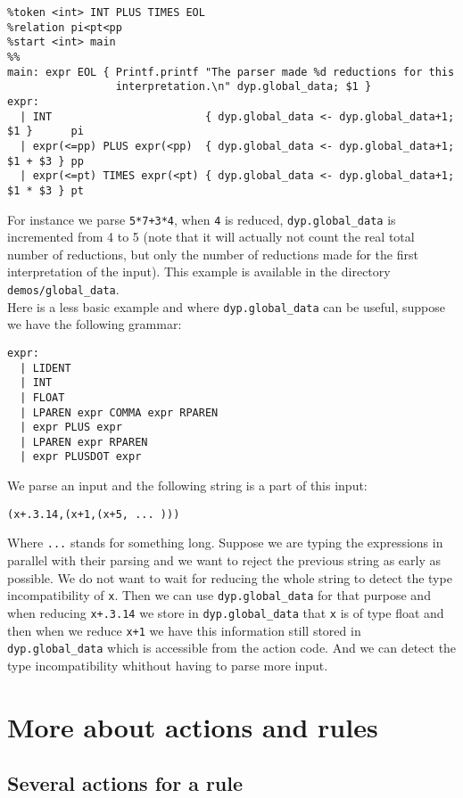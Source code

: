 \documentclass[12pt]{article}
\begin{document}
{\begin{verbatim}
%token <int> INT PLUS TIMES EOL
%relation pi<pt<pp
%start <int> main
%%
main: expr EOL { Printf.printf "The parser made %d reductions for this
                 interpretation.\n" dyp.global_data; $1 }
expr:
  | INT                        { dyp.global_data <- dyp.global_data+1; $1 }      pi
  | expr(<=pp) PLUS expr(<pp)  { dyp.global_data <- dyp.global_data+1; $1 + $3 } pp
  | expr(<=pt) TIMES expr(<pt) { dyp.global_data <- dyp.global_data+1; $1 * $3 } pt
\end{verbatim}
For instance we parse \texttt{5*7+3*4}, when \texttt{4} is reduced, \verb|dyp.global_data| is incremented from 4 to 5 (note that it will actually not count the real total number of reductions, but only the number of reductions made for the first interpretation of the input). This example is available in the directory \verb|demos/global_data|.\\

Here is a less basic example and where \verb|dyp.global_data| can be useful, suppose we have the following grammar:
\begin{verbatim}
expr:
  | LIDENT
  | INT
  | FLOAT
  | LPAREN expr COMMA expr RPAREN
  | expr PLUS expr
  | LPAREN expr RPAREN
  | expr PLUSDOT expr
\end{verbatim}

We parse an input and the following string is a part of this input:
\begin{verbatim}
(x+.3.14,(x+1,(x+5, ... )))
\end{verbatim}
Where \texttt{...} stands for something long. Suppose we are typing the expressions in parallel with their parsing and we want to reject the previous string as early as possible. We do not want to wait for reducing the whole string to detect the type incompatibility of \texttt{x}. Then we can use \verb|dyp.global_data| for that purpose and when reducing \texttt{x+.3.14} we store in \verb|dyp.global_data| that \texttt{x} is of type float and then when we reduce \texttt{x+1} we have this information still stored in \verb|dyp.global_data| which is accessible from the action code. And we can detect the type incompatibility whithout having to parse more input.

\section{More about actions and rules}

\subsection{Several actions for a rule}

}
\end{document}
